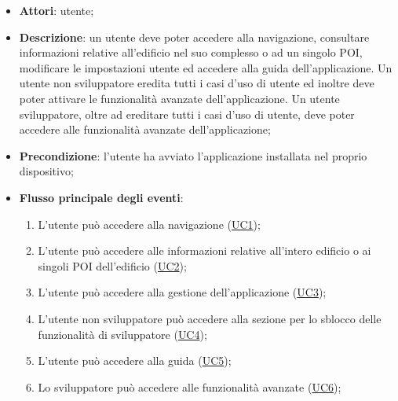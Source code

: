 \documentclass[../AnalisiDeiRequisiti.tex]{subfiles}
\begin{document}
\begin{itemize}
\item \textbf{Attori}: utente;
\item \textbf{Descrizione}: un utente deve poter accedere alla navigazione, consultare informazioni relative all'edificio nel suo complesso o ad un singolo POI, modificare le impostazioni utente ed accedere alla guida dell'applicazione. Un utente non sviluppatore eredita tutti i casi d'uso di utente ed inoltre deve poter attivare le funzionalità avanzate dell'applicazione. Un utente sviluppatore, oltre ad ereditare tutti i casi d'uso di utente, deve poter accedere alle funzionalità avanzate dell'applicazione; 
      \item \textbf{Precondizione}: l'utente ha avviato l'applicazione installata nel proprio dispositivo;

        \item \textbf{Flusso principale degli eventi}:
          \begin{enumerate}
          \item L'utente può accedere alla navigazione (\hyperlink{UC1}{UC1});
          \item L'utente può accedere alle informazioni relative all'intero edificio o ai singoli POI dell'edificio (\hyperlink{UC2}{UC2});
          \item L'utente può accedere alla gestione dell'applicazione (\hyperlink{UC3}{UC3});
          \item L'utente non sviluppatore può accedere alla sezione per lo sblocco delle funzionalità di sviluppatore (\hyperlink{UC4}{UC4});
          \item L'utente può accedere alla guida (\hyperlink{UC5}{UC5});
          \item Lo sviluppatore può accedere alle funzionalità avanzate (\hyperlink{UC6}{UC6});


\end{enumerate}
\end{itemize}
\end{document}
